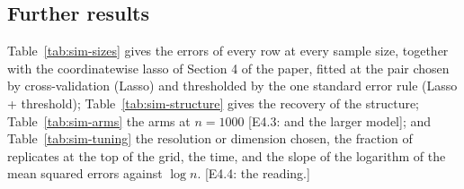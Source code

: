 \documentclass[10pt]{book}
\theoremstyle{definition}
\begin{document}
{\subsection*{Further results}

Table~\ref{tab:sim-sizes} gives the errors of every row at every sample size,
together with the coordinatewise lasso of Section 4 of the paper, fitted at
the pair chosen by cross-validation (Lasso) and thresholded by the one
standard error rule (Lasso + threshold); Table~\ref{tab:sim-structure} gives
the recovery of the structure; Table~\ref{tab:sim-arms} the arms at
$n = 1000$ [E4.3: and the larger model]; and Table~\ref{tab:sim-tuning} the
resolution or dimension chosen, the fraction of replicates at the top of the
grid, the time, and the slope of the logarithm of the mean squared errors
against $\log n$. [E4.4: the reading.]





}
\end{document}
